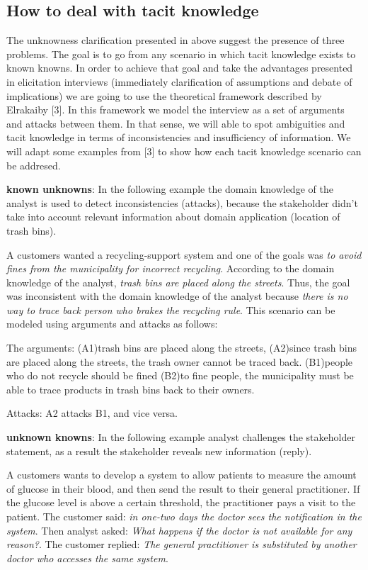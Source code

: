 \documentclass[]{llncs}
\begin{document}
\hypertarget{how-to-deal-with-tacit-knowledge}{%
\subsection{How to deal with tacit
knowledge}\label{how-to-deal-with-tacit-knowledge}}

The unknowness clarification presented in above suggest the presence of
three problems. The goal is to go from any scenario in which tacit
knowledge exists to known knowns. In order to achieve that goal and take
the advantages presented in elicitation interviews (immediately
clarification of assumptions and debate of implications) we are going to
use the theoretical framework described by Elrakaiby {[}3{]}. In this
framework we model the interview as a set of arguments and attacks
between them. In that sense, we will able to spot ambiguities and tacit
knowledge in terms of inconsistencies and insufficiency of information.
We will adapt some examples from {[}3{]} to show how each tacit
knowledge scenario can be addresed.

\textbf{known unknowns}: In the following example the domain knowledge
of the analyst is used to detect inconsistencies (attacks), because the
stakeholder didn't take into account relevant information about domain
application (location of trash bins).

A customers wanted a recycling-support system and one of the goals was
\emph{to avoid fines from the municipality for incorrect recycling}.
According to the domain knowledge of the analyst, \emph{trash bins are
placed along the streets}. Thus, the goal was inconsistent with the
domain knowledge of the analyst because \emph{there is no way to trace
back person who brakes the recycling rule}. This scenario can be modeled
using arguments and attacks as follows:

The arguments: (A1)trash bins are placed along the streets, (A2)since
trash bins are placed along the streets, the trash owner cannot be
traced back. (B1)people who do not recycle should be fined (B2)to fine
people, the municipality must be able to trace products in trash bins
back to their owners.

Attacks: A2 attacks B1, and vice versa.

\textbf{unknown knowns}: In the following example analyst challenges the
stakeholder statement, as a result the stakeholder reveals new
information (reply).

A customers wants to develop a system to allow patients to measure the
amount of glucose in their blood, and then send the result to their
general practitioner. If the glucose level is above a certain threshold,
the practitioner pays a visit to the patient. The customer said:
\emph{in one-two days the doctor sees the notification in the system}.
Then analyst asked: \emph{What happens if the doctor is not available
for any reason?}. The customer replied: \emph{The general practitioner
is substituted by another doctor who accesses the same system}.
\end{document}
